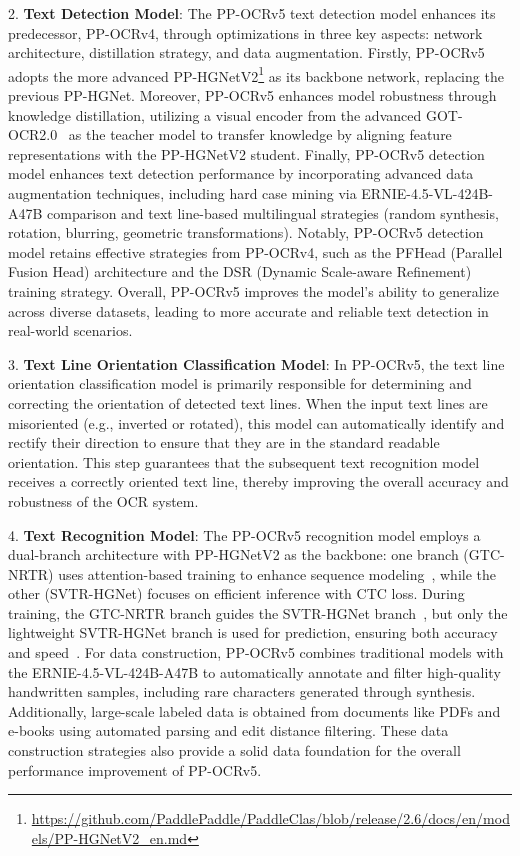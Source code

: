 \documentclass[11pt, a4paper, logo, copyright, nonumbering]{paddleocr}
\begin{document}
2. \textbf{Text Detection Model}: The PP-OCRv5 text detection model enhances its predecessor, PP-OCRv4, through optimizations in three key aspects: network architecture, distillation strategy, and data augmentation. Firstly, PP-OCRv5 adopts the more advanced PP-HGNetV2\footnote{\label{hgnetv2}\url{https://github.com/PaddlePaddle/PaddleClas/blob/release/2.6/docs/en/models/PP-HGNetV2_en.md}} as its backbone network, replacing the previous PP-HGNet.  Moreover, PP-OCRv5 enhances model robustness through knowledge distillation, utilizing a visual encoder from the advanced GOT-OCR2.0~\citep{wei2024general} as the teacher model to transfer knowledge by aligning feature representations with the PP-HGNetV2 student. Finally, PP-OCRv5 detection model enhances text detection performance by incorporating advanced data augmentation techniques, including hard case mining via ERNIE-4.5-VL-424B-A47B comparison and text line-based multilingual strategies (random synthesis, rotation, blurring, geometric transformations). Notably, PP-OCRv5 detection model retains effective strategies from PP-OCRv4, such as the PFHead (Parallel Fusion Head) architecture and the DSR (Dynamic Scale-aware Refinement) training strategy. Overall, PP-OCRv5 improves the model’s ability to generalize across diverse datasets, leading to more accurate and reliable text detection in real-world scenarios. 


3. \textbf{Text Line Orientation Classification Model}: In PP-OCRv5, the text line orientation classification model is primarily responsible for determining and correcting the orientation of detected text lines. When the input text lines are misoriented (e.g., inverted or rotated), this model can automatically identify and rectify their direction to ensure that they are in the standard readable orientation. This step guarantees that the subsequent text recognition model receives a correctly oriented text line, thereby improving the overall accuracy and robustness of the OCR system.

4. \textbf{Text Recognition Model}: The PP-OCRv5 recognition model employs a dual-branch architecture with PP-HGNetV2 as the backbone: one branch (GTC-NRTR) uses attention-based training to enhance sequence modeling~\citep{hu2020gtc}, while the other (SVTR-HGNet) focuses on efficient inference with CTC loss. During training, the GTC-NRTR branch guides the SVTR-HGNet branch~\citep{du2022svtr}, but only the lightweight SVTR-HGNet branch is used for prediction, ensuring both accuracy and speed~\citep{li2022ppocrv3}. For data construction, PP-OCRv5 combines traditional models with the ERNIE-4.5-VL-424B-A47B to automatically annotate and filter high-quality handwritten samples, including rare characters generated through synthesis. Additionally, large-scale labeled data is obtained from documents like PDFs and e-books using automated parsing and edit distance filtering. These data construction strategies also provide a solid data foundation for the overall performance improvement of PP-OCRv5.
\end{document}
